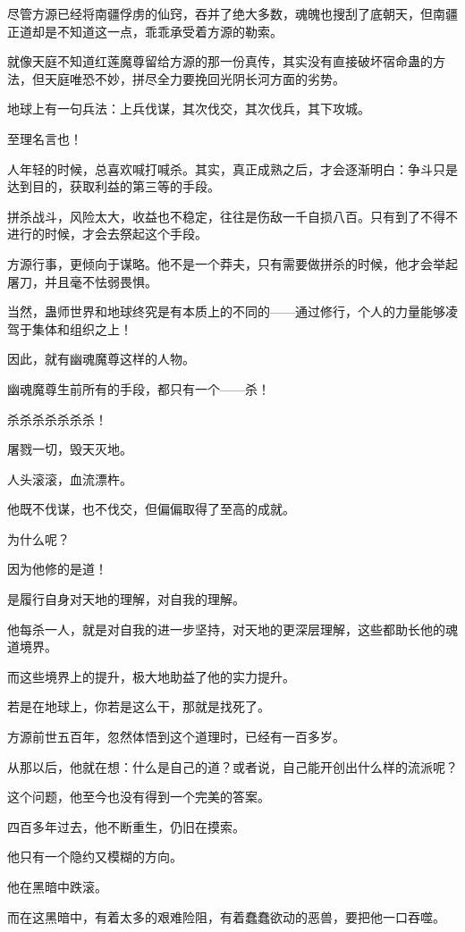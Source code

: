 \begin{this_body}
尽管方源已经将南疆俘虏的仙窍，吞并了绝大多数，魂魄也搜刮了底朝天，但南疆正道却是不知道这一点，乖乖承受着方源的勒索。

就像天庭不知道红莲魔尊留给方源的那一份真传，其实没有直接破坏宿命蛊的方法，但天庭唯恐不妙，拼尽全力要挽回光阴长河方面的劣势。

地球上有一句兵法：上兵伐谋，其次伐交，其次伐兵，其下攻城。

至理名言也！

人年轻的时候，总喜欢喊打喊杀。其实，真正成熟之后，才会逐渐明白：争斗只是达到目的，获取利益的第三等的手段。

拼杀战斗，风险太大，收益也不稳定，往往是伤敌一千自损八百。只有到了不得不进行的时候，才会去祭起这个手段。

方源行事，更倾向于谋略。他不是一个莽夫，只有需要做拼杀的时候，他才会举起屠刀，并且毫不怯弱畏惧。

当然，蛊师世界和地球终究是有本质上的不同的——通过修行，个人的力量能够凌驾于集体和组织之上！

因此，就有幽魂魔尊这样的人物。

幽魂魔尊生前所有的手段，都只有一个——杀！

杀杀杀杀杀杀杀！

屠戮一切，毁天灭地。

人头滚滚，血流漂杵。

他既不伐谋，也不伐交，但偏偏取得了至高的成就。

为什么呢？

因为他修的是道！

是履行自身对天地的理解，对自我的理解。

他每杀一人，就是对自我的进一步坚持，对天地的更深层理解，这些都助长他的魂道境界。

而这些境界上的提升，极大地助益了他的实力提升。

若是在地球上，你若是这么干，那就是找死了。

方源前世五百年，忽然体悟到这个道理时，已经有一百多岁。

从那以后，他就在想：什么是自己的道？或者说，自己能开创出什么样的流派呢？

这个问题，他至今也没有得到一个完美的答案。

四百多年过去，他不断重生，仍旧在摸索。

他只有一个隐约又模糊的方向。

他在黑暗中跌滚。

而在这黑暗中，有着太多的艰难险阻，有着蠢蠢欲动的恶兽，要把他一口吞噬。


\end{this_body}
